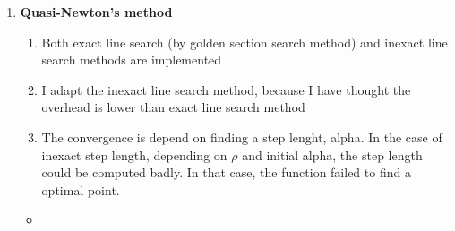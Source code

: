 \documentclass[../main.tex]{subfiles}
\begin{document}
\begin{enumerate}
\begin{enumerate}
        \newpage %
        \item \textbf{Quasi-Newton's method}
        \begin{enumerate}
          \item Both exact line search (by golden section search method) and inexact line search methods are implemented
          \item I adapt the inexact line search method, because I have thought the overhead is lower than exact line search method
          \item The convergence is depend on finding a step lenght, alpha. 
          In the case of inexact step length, depending on $\rho$ and initial alpha, the step length could be computed badly.
          In that case, the function failed to find a optimal point.
        \end{enumerate}
        \begin{itemize}[label=\quad,leftmargin=-5em]
          \item {}
        \end{itemize}
    \end{enumerate}
\end{enumerate}
\end{document}
